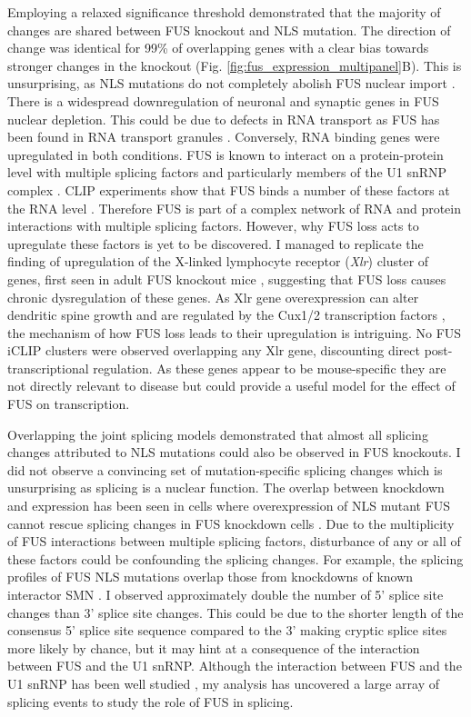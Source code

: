 Employing a relaxed significance threshold demonstrated that the majority of changes are shared between  FUS knockout and NLS mutation.
The direction of change was identical for 99\% of overlapping genes with a clear bias towards stronger changes in the knockout (Fig. \ref{fig:fus_expression_multipanel}B). 
This is unsurprising, as NLS mutations do not completely abolish FUS nuclear import \citep{Scekic-zahirovic2016, Devoy2017}.
There is a widespread downregulation of neuronal and synaptic genes in FUS nuclear depletion. 
This could be due to defects in RNA transport as FUS has been found in RNA transport granules \citep{Kanai2004, Fujii2005}.
Conversely, RNA binding genes were upregulated in both conditions. 
FUS is known to interact on a protein-protein level with multiple splicing factors \citep{Yang1998,Meissner2003, Groen2013} and particularly members of the U1 snRNP complex \citep{Sun2015a, Yu2015a}. 
CLIP experiments show that FUS binds a number of these factors at the RNA level \citep{Nakaya2013}.
Therefore FUS is part of a complex network of RNA and protein interactions with multiple splicing factors. 
However, why FUS loss acts to upregulate these factors is yet to be discovered.
I managed to replicate the finding of upregulation of the X-linked lymphocyte receptor (\textit{Xlr}) cluster of genes, first seen in adult FUS knockout mice \citep{Kino2015}, suggesting that FUS loss causes chronic dysregulation of these genes. 
As Xlr gene overexpression can alter dendritic spine growth and are regulated by the Cux1/2 transcription factors \citep{Cubelos2010}, the mechanism of how FUS loss leads to their upregulation is intriguing. 
No FUS iCLIP clusters were observed overlapping any Xlr gene, discounting direct post-transcriptional regulation.
As these genes appear to be mouse-specific they are not directly relevant to disease but could provide a useful model for the effect of FUS on transcription.

Overlapping the joint splicing models demonstrated that almost all splicing changes attributed to NLS mutations could also be observed in FUS knockouts.
I did not observe a convincing set of mutation-specific splicing changes which is unsurprising as splicing is a nuclear function. 
The overlap between knockdown and expression has been seen in cells where overexpression of NLS mutant FUS cannot rescue splicing changes in FUS knockdown cells \citep{Sun2015a}.
Due to the multiplicity of FUS interactions between multiple splicing factors, disturbance of any or all of these factors could be confounding the splicing changes. 
For example, the splicing profiles of FUS NLS mutations overlap those from knockdowns of known interactor SMN \citep{Mirra2017}.
I observed approximately double the number of 5' splice site changes than 3' splice site changes. 
This could be due to the shorter length of the consensus 5' splice site sequence compared to the 3' making cryptic splice sites more likely by chance, but it may hint at a consequence of the interaction between FUS and the U1 snRNP.
Although the interaction between FUS and the U1 snRNP has been well studied \citep{Nakaya2013,Yu2015a,Yu2015b}, my analysis has uncovered a large array of splicing events to study the role of FUS in splicing.


